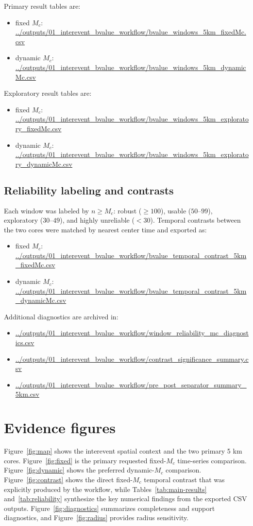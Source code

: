 \documentclass[11pt]{article}
\begin{document}
Primary result tables are:
\begin{itemize}[leftmargin=1.5em]
    \item fixed $M_c$: \url{../outputs/01_interevent_bvalue_workflow/bvalue_windows_5km_fixedMc.csv}
    \item dynamic $M_c$: \url{../outputs/01_interevent_bvalue_workflow/bvalue_windows_5km_dynamicMc.csv}
\end{itemize}
Exploratory result tables are:
\begin{itemize}[leftmargin=1.5em]
    \item fixed $M_c$: \url{../outputs/01_interevent_bvalue_workflow/bvalue_windows_5km_exploratory_fixedMc.csv}
    \item dynamic $M_c$: \url{../outputs/01_interevent_bvalue_workflow/bvalue_windows_5km_exploratory_dynamicMc.csv}
\end{itemize}

\subsection{Reliability labeling and contrasts}
Each window was labeled by $n\geq M_c$: robust ($\geq 100$), usable ($50$--$99$), exploratory ($30$--$49$), and highly unreliable ($<30$). Temporal contrasts between the two cores were matched by nearest center time and exported as:
\begin{itemize}[leftmargin=1.5em]
    \item fixed $M_c$: \url{../outputs/01_interevent_bvalue_workflow/bvalue_temporal_contrast_5km_fixedMc.csv}
    \item dynamic $M_c$: \url{../outputs/01_interevent_bvalue_workflow/bvalue_temporal_contrast_5km_dynamicMc.csv}
\end{itemize}
Additional diagnostics are archived in:
\begin{itemize}[leftmargin=1.5em]
    \item \url{../outputs/01_interevent_bvalue_workflow/window_reliability_mc_diagnostics.csv}
    \item \url{../outputs/01_interevent_bvalue_workflow/contrast_significance_summary.csv}
    \item \url{../outputs/01_interevent_bvalue_workflow/pre_post_separator_summary_5km.csv}
\end{itemize}

\section{Evidence figures}
Figure~\ref{fig:map} shows the interevent spatial context and the two primary 5 km cores. Figure~\ref{fig:fixed} is the primary requested fixed-$M_c$ time-series comparison. Figure~\ref{fig:dynamic} shows the preferred dynamic-$M_c$ comparison. Figure~\ref{fig:contrast} shows the direct fixed-$M_c$ temporal contrast that was explicitly produced by the workflow, while Tables~\ref{tab:main-results} and~\ref{tab:reliability} synthesize the key numerical findings from the exported CSV outputs. Figure~\ref{fig:diagnostics} summarizes completeness and support diagnostics, and Figure~\ref{fig:radius} provides radius sensitivity.
\end{document}
